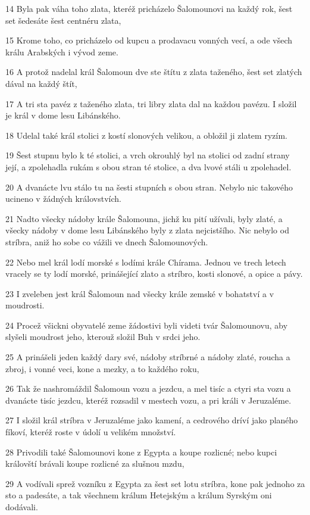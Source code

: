 \par 14 Byla pak váha toho zlata, kteréž pricházelo Šalomounovi na každý rok, šest set šedesáte šest centnéru zlata,
\par 15 Krome toho, co pricházelo od kupcu a prodavacu vonných vecí, a ode všech králu Arabských i vývod zeme.
\par 16 A protož nadelal král Šalomoun dve ste štítu z zlata taženého, šest set zlatých dával na každý štít,
\par 17 A tri sta pavéz z taženého zlata, tri libry zlata dal na každou pavézu. I složil je král v dome lesu Libánského.
\par 18 Udelal také král stolici z kostí slonových velikou, a obložil ji zlatem ryzím.
\par 19 Šest stupnu bylo k té stolici, a vrch okrouhlý byl na stolici od zadní strany její, a zpolehadla rukám s obou stran té stolice, a dva lvové stáli u zpolehadel.
\par 20 A dvanácte lvu stálo tu na šesti stupních s obou stran. Nebylo nic takového ucineno v žádných královstvích.
\par 21 Nadto všecky nádoby krále Šalomouna, jichž ku pití užívali, byly zlaté, a všecky nádoby v dome lesu Libánského byly z zlata nejcistšího. Nic nebylo od stríbra, aniž ho sobe co vážili ve dnech Šalomounových.
\par 22 Nebo mel král lodí morské s lodími krále Chírama. Jednou ve trech letech vracely se ty lodí morské, prinášející zlato a stríbro, kosti slonové, a opice a pávy.
\par 23 I zveleben jest král Šalomoun nad všecky krále zemské v bohatství a v moudrosti.
\par 24 Procež všickni obyvatelé zeme žádostivi byli videti tvár Šalomounovu, aby slyšeli moudrost jeho, kterouž složil Buh v srdci jeho.
\par 25 A prinášeli jeden každý dary své, nádoby stríbrné a nádoby zlaté, roucha a zbroj, i vonné veci, kone a mezky, a to každého roku,
\par 26 Tak že nashromáždil Šalomoun vozu a jezdcu, a mel tisíc a ctyri sta vozu a dvanácte tisíc jezdcu, kteréž rozsadil v mestech vozu, a pri králi v Jeruzaléme.
\par 27 I složil král stríbra v Jeruzaléme jako kamení, a cedrového dríví jako planého fíkoví, kteréž roste v údolí u velikém množství.
\par 28 Privodili také Šalomounovi kone z Egypta a koupe rozlicné; nebo kupci královští brávali koupe rozlicné za slušnou mzdu,
\par 29 A vodívali sprež vozníku z Egypta za šest set lotu stríbra, kone pak jednoho za sto a padesáte, a tak všechnem králum Hetejským a králum Syrským oni dodávali.

